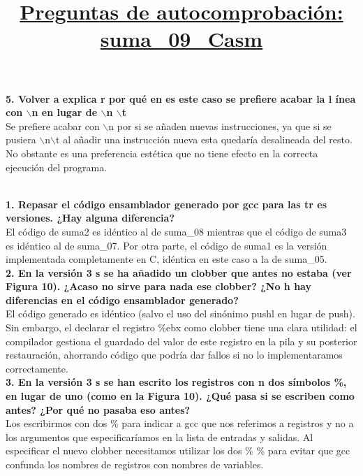 \documentclass[11pt,a4paper]{article}
\begin{document}
\textbf{5. Volver a explica r por qué en es este caso se prefiere acabar la l ínea con $\backslash$n en lugar de $\backslash$n $\backslash$t} \\

Se prefiere acabar con $\backslash$n por si se añaden nuevas instrucciones, ya que si se pusiera $\backslash$n$\backslash$t al añadir una instrucción nueva esta quedaría desalineada del resto. \\
No obstante es una preferencia estética que no tiene efecto en la correcta ejecución del programa. \\

\title{\large{\textbf{\underline{Preguntas de autocomprobación: suma\_09\_Casm}}}} \\

\textbf{1. Repasar el código ensamblador generado por gcc para las tr es versiones. ¿Hay alguna diferencia? } \\

El código de suma2 es idéntico al de suma\_08 mientras que el código de suma3 es idéntico al de suma\_07. Por otra parte, el código de suma1 es la versión implementada completamente en C, idéntica en este caso a la de suma\_05. \\

\textbf{2. En la versión 3 s se ha añadido un clobber que  antes no estaba (ver Figura 10). ¿Acaso no sirve  para nada ese  clobber? ¿No h hay diferencias  en el código ensamblador generado? } \\

El código generado es idéntico (salvo el uso del sinónimo pushl en lugar de push). Sin embargo, el declarar el registro \%ebx como clobber tiene una clara utilidad: el compilador gestiona el guardado del valor de este registro en la pila y su posterior restauración, ahorrando código que podría dar fallos si no lo implementaramos correctamente. \\

\textbf{3. En la versión 3 s se han escrito los registros con n dos símbolos  \%, en lugar de  uno (como en la Figura 10). ¿Qué pasa si se  escriben como  antes? ¿Por qué no pasaba eso antes? } \\

Los escribirmos con dos \% para indicar a gcc que nos referimos a registros y no a los argumentos que especificaríamos en la lista de entradas y salidas. Al especificar el nuevo clobber necesitamos utilizar los dos \% \% para evitar que gcc confunda los nombres de registros con nombres de variables. \\
\end{document}
